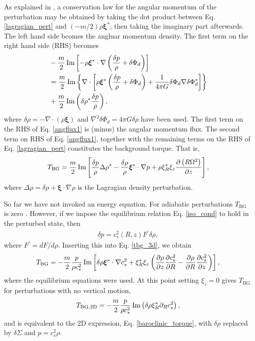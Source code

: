 As explained in \cite{lin11b}, a conservation law for the angular
momentum of the perturbation may be obtained by taking the dot product
between Eq. \ref{lagragian_pert} and $(-m/2)\rho\bm{\xi}^*$, then
taking the imaginary part afterwards. The left hand side bcomes the
angluar momentum density. The first term on the right hand side (RHS)
becomes 
\begin{align}\label{angflux1}
  &-\frac{m}{2}\operatorname{Im}\left[-\rho\bm{\xi}^*\cdot\nabla\left(\frac{\delta p}{\rho} + \delta
    \Phi_d\right)\right] \notag\\ 
&= \frac{m}{2}\operatorname{Im}\left\{\nabla\cdot\left[\rho\bm{\xi}^*\left(\frac{\delta p}{\rho} + \delta
    \Phi_d \right) + \frac{1}{4\pi
    G}\delta\Phi_d\nabla\delta\Phi_d^*\right]\right\} \notag\\
&+ \frac{m}{2}\operatorname{Im}\left(\delta\rho^*\frac{\delta p}{\rho}\right),
\end{align}
where $\delta\rho = - \nabla\cdot\left(\rho\bm{\xi}\right)$ and
$\nabla^2\delta\Phi_d = 4\pi G \delta \rho$ have been used. The first
term on the RHS of Eq. \ref{angflux1} is (minus) the 
angular momentum flux. The second term on RHS of Eq. \ref{angflux1}, 
together with the remaining terms on the RHS of 
Eq. \ref{lagragian_pert} constitutes the background torque. That is, 
\begin{align}\label{tbg_3d}
  T_\mathrm{BG} = \frac{m}{2}\operatorname{Im}\left[
    \frac{\delta p}{\rho} \Delta\rho^* -
    \frac{\delta\rho}{\rho}\bm{\xi}^*\cdot\nabla p  
    + \rho \xi_R^*\xi_z\frac{\partial\left(R\Omega^2\right)}{\partial z}\right],
\end{align}
where $\Delta\rho = \delta\rho + \bm{\xi}\cdot\nabla\rho$ is the
Lagragian density perturbation. 

So far we have not invoked an energy equation. For 
adiabatic perturbations $T_\mathrm{BG}$ is zero
\citep{lin93b}. However, if we impose the equilibrium relation
Eq. \ref{iso_cond} to hold in the perturbed state, then
\begin{align}
  \delta p = c_s^2(R,z) F^\prime \delta\rho,
\end{align}
where $F^\prime = dF/d\rho$. Inserting this into Eq. \ref{tbg_3d}, we
obtain
\begin{align}\label{tbg_3d_2}
  T_\mathrm{BG} = -\frac{m}{2}\frac{p}{\rho
    c_s^2}\operatorname{Im}\left[\delta\rho\bm{\xi}^*\cdot\nabla c_s^2 +
    \xi_R^*\xi_z \left(\frac{\partial\rho}{\partial z}\frac{\partial c_s^2}{\partial R} -
      \frac{\partial\rho}{\partial R}\frac{\partial c_s^2}{\partial z}\right)\right],
\end{align}
where the equilibrium equations were used. 
At this point setting $\xi_z=0$ gives $T_\mathrm{BG}$ for
perturbations with no vertical motion, 
\begin{align}
  T_\mathrm{BG,2D} = -\frac{m}{2}\frac{p}{\rho
    c_s^2}\operatorname{Im}\left(\delta\rho \xi_R^*  \partial_R c_s^2 \right),
\end{align}
and is equivalent to the 2D
expression, Eq. \ref{baroclinic_torque}, with $\delta\rho $ replaced
by $\delta \Sigma$ and $p=c_s^2\rho$. %


